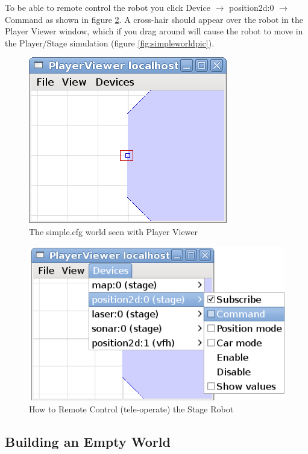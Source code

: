 \documentclass[a4paper]{article}
\newcommand{\plst}{Player/Stage\xspace}
\newcommand{\pl}{Player\xspace}
\begin{document}
To be able to remote control the robot you click Device $\rightarrow$ position2d:0 $\rightarrow$ Command as shown in figure \ref{fig:playerv_teleoperation}. A cross-hair should appear over the robot in the \pl Viewer window, which if you drag around will cause the robot to move in the \plst simulation (figure \ref{fig:simpleworldpic}).

\begin{figure}
	\centering
	\includegraphics[width=0.4\linewidth]{./pics/playerv_simpleworld.png}
	\caption{The simple.cfg world seen with \pl Viewer}
	\label{fig:playerv_simpleworldpic}
\end{figure}

\begin{figure}
	\centering
	\includegraphics[width=0.6\linewidth]{./pics/playerv_teleoperation.png}
	\caption{How to Remote Control (tele-operate) the Stage Robot}
	\label{fig:playerv_teleoperation}
\end{figure}



\subsection{Building an Empty World} \label{sec:emptyWorld}
\end{document}
